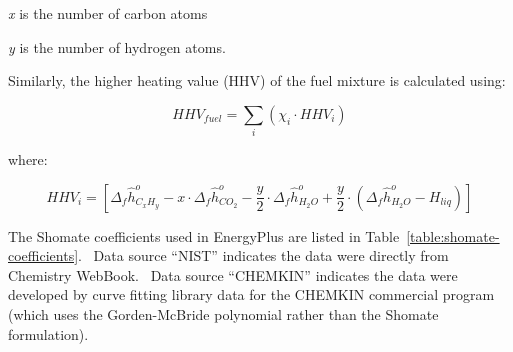 \emph{x} is the number of carbon atoms

\emph{y} is the number of hydrogen atoms.

Similarly, the higher heating value (HHV) of the fuel mixture is calculated using:

\begin{equation}
HH{V_{fuel}} = \sum\limits_i {\left( {{\chi_i} \cdot HH{V_i}} \right)}
\end{equation}

where:

\begin{equation}
HH{V_i} = \left[ {{\Delta_f}\hat h_{{C_x}{H_y}}^o - x \cdot {\Delta_f}\hat h_{C{O_2}}^o - \frac{y}{2} \cdot {\Delta_f}\hat h_{{H_2}O}^o + \frac{y}{2} \cdot \left( {{\Delta_f}\hat h_{{H_2}O}^o - {H_{liq}}} \right)} \right]
\end{equation}

The Shomate coefficients used in EnergyPlus are listed in Table~\ref{table:shomate-coefficients}.~ Data source ``NIST'' indicates the data were directly from Chemistry WebBook.~ Data source ``CHEMKIN'' indicates the data were developed by curve fitting library data for the CHEMKIN commercial program (which uses the Gorden-McBride polynomial rather than the Shomate formulation).

